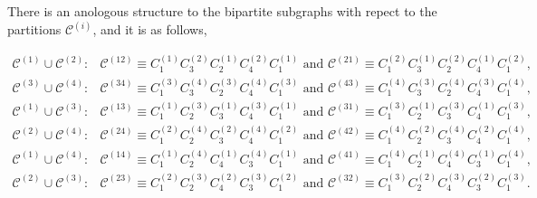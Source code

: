 \documentclass[11pt]{article}
\begin{document}
There is an anologous structure to the bipartite subgraphs with repect to
the partitions $\mathcal{C}^{\left( i\right) }$, and it is as follows,

\begin{equation*}
\begin{array}{cc}
\mathcal{C}^{\left( 1\right) }\cup \mathcal{C}^{\left( 2\right) }: & 
\mathcal{C}^{\left( 12\right) }\equiv C_{1}^{\left( 1\right) }C_{3}^{\left(
2\right) }C_{2}^{\left( 1\right) }C_{4}^{\left( 2\right) }C_{1}^{\left(
1\right) }\text{ and }\mathcal{C}^{\left( 21\right) }\equiv C_{1}^{\left(
2\right) }C_{3}^{\left( 1\right) }C_{2}^{\left( 2\right) }C_{4}^{\left(
1\right) }C_{1}^{\left( 2\right) }, \\ 
\mathcal{C}^{\left( 3\right) }\cup \mathcal{C}^{\left( 4\right) }: & 
\mathcal{C}^{\left( 34\right) }\equiv C_{1}^{\left( 3\right) }C_{3}^{\left(
4\right) }C_{2}^{\left( 3\right) }C_{4}^{\left( 4\right) }C_{1}^{\left(
3\right) }\text{ and }\mathcal{C}^{\left( 43\right) }\equiv C_{1}^{\left(
4\right) }C_{3}^{\left( 3\right) }C_{2}^{\left( 4\right) }C_{4}^{\left(
3\right) }C_{1}^{\left( 4\right) }, \\ 
\mathcal{C}^{\left( 1\right) }\cup \mathcal{C}^{\left( 3\right) }: & 
\mathcal{C}^{\left( 13\right) }\equiv C_{1}^{\left( 1\right) }C_{2}^{\left(
3\right) }C_{3}^{\left( 1\right) }C_{4}^{\left( 3\right) }C_{1}^{\left(
1\right) }\text{ and }\mathcal{C}^{\left( 31\right) }\equiv C_{1}^{\left(
3\right) }C_{2}^{\left( 1\right) }C_{3}^{\left( 3\right) }C_{4}^{\left(
1\right) }C_{1}^{\left( 3\right) }, \\ 
\mathcal{C}^{\left( 2\right) }\cup \mathcal{C}^{\left( 4\right) }: & 
\mathcal{C}^{\left( 24\right) }\equiv C_{1}^{\left( 2\right) }C_{2}^{\left(
4\right) }C_{3}^{\left( 2\right) }C_{4}^{\left( 4\right) }C_{1}^{\left(
2\right) }\text{ and }\mathcal{C}^{\left( 42\right) }\equiv C_{1}^{\left(
4\right) }C_{2}^{\left( 2\right) }C_{3}^{\left( 4\right) }C_{4}^{\left(
2\right) }C_{1}^{\left( 4\right) }, \\ 
\mathcal{C}^{\left( 1\right) }\cup \mathcal{C}^{\left( 4\right) }: & 
\mathcal{C}^{\left( 14\right) }\equiv C_{1}^{\left( 1\right) }C_{2}^{\left(
4\right) }C_{4}^{\left( 1\right) }C_{3}^{\left( 4\right) }C_{1}^{\left(
1\right) }\text{ and }\mathcal{C}^{\left( 41\right) }\equiv C_{1}^{\left(
4\right) }C_{2}^{\left( 1\right) }C_{4}^{\left( 4\right) }C_{3}^{\left(
1\right) }C_{1}^{\left( 4\right) }, \\ 
\mathcal{C}^{\left( 2\right) }\cup \mathcal{C}^{\left( 3\right) }: & 
\mathcal{C}^{\left( 23\right) }\equiv C_{1}^{\left( 2\right) }C_{2}^{\left(
3\right) }C_{4}^{\left( 2\right) }C_{3}^{\left( 3\right) }C_{1}^{\left(
2\right) }\text{ and }\mathcal{C}^{\left( 32\right) }\equiv C_{1}^{\left(
3\right) }C_{2}^{\left( 2\right) }C_{4}^{\left( 3\right) }C_{3}^{\left(
2\right) }C_{1}^{\left( 3\right) }.%
\end{array}%
\end{equation*}
\end{document}
